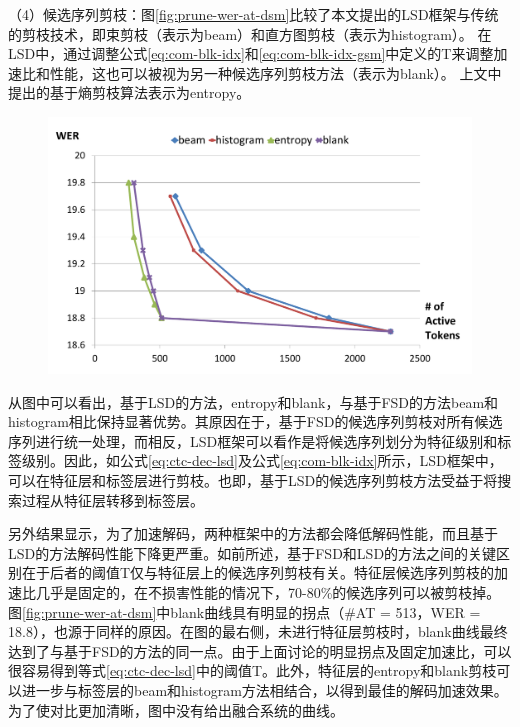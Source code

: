（4）候选序列剪枝：图\ref{fig:prune-wer-at-dsm}比较了本文提出的LSD框架与传统的剪枝技术，即束剪枝（表示为beam）和直方图剪枝（表示为histogram）。 在LSD中，通过调整公式\ref{eq:com-blk-idx}和\ref{eq:com-blk-idx-gsm}中定义的T来调整加速比和性能，这也可以被视为另一种候选序列剪枝方法（表示为blank）。 上文中提出的基于熵剪枝算法表示为entropy。
 

\begin{figure}[!htp]
  \centering
    \captionstyle{\centering}
    \includegraphics[width=\textwidth]{figure/prune-wer-at-dsm.pdf}
\end{figure}


从图中可以看出，基于LSD的方法，entropy和blank，与基于FSD的方法beam和histogram相比保持显著优势。其原因在于，基于FSD的候选序列剪枝对所有候选序列进行统一处理，而相反，LSD框架可以看作是将候选序列划分为特征级别和标签级别。因此，如公式\ref{eq:ctc-dec-lsd}及公式\ref{eq:com-blk-idx}所示，LSD框架中，可以在特征层和标签层进行剪枝。也即，基于LSD的候选序列剪枝方法受益于将搜索过程从特征层转移到标签层。

另外结果显示，为了加速解码，两种框架中的方法都会降低解码性能，而且基于LSD的方法解码性能下降更严重。如前所述，基于FSD和LSD的方法之间的关键区别在于后者的阈值T仅与特征层上的候选序列剪枝有关。特征层候选序列剪枝的加速比几乎是固定的，在不损害性能的情况下，70-80\%的候选序列可以被剪枝掉。图\ref{fig:prune-wer-at-dsm}中blank曲线具有明显的拐点（\#AT = 513，WER = 18.8），也源于同样的原因。在图的最右侧，未进行特征层剪枝时，blank曲线最终达到了与基于FSD的方法的同一点。由于上面讨论的明显拐点及固定加速比，可以很容易得到等式\ref{eq:ctc-dec-lsd}中的阈值T。此外，特征层的entropy和blank剪枝可以进一步与标签层的beam和histogram方法相结合，以得到最佳的解码加速效果。为了使对比更加清晰，图中没有给出融合系统的曲线。

